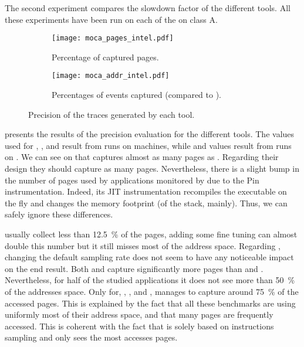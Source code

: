 The second experiment compares the
slowdown factor of the different tools.  All these experiments have been run on each of the \NPB on class A.

\begin{figure}[htb]
    \centering
    \begin{subfigure}{\linewidth}
        \texttt{[image: moca\_pages\_intel.pdf]}
        \caption{Percentage of captured pages.}
        \label{fig:pages}
    \end{subfigure}
    \begin{subfigure}{\linewidth}
        \texttt{[image: moca\_addr\_intel.pdf]}
        \caption{Percentages of events captured (compared to \Moca).}
        \label{fig:addr}
    \end{subfigure}
    \caption{Precision of the traces generated by each tool.}
    \label{fig:pages-addr}
\end{figure}

 presents the results of the precision evaluation for the
different tools. The values used for \Mitos, \MitosTun, \Moca and
\TABARNAC result from runs on \Edel machines, while \MemProf and \MemProfTun values result from runs on
\Stremi.
We can see on  that \Moca captures almost as many pages as \TABARNAC.
Regarding their design they should capture as many pages. Nevertheless, there is a slight
bump in the number of pages used by applications monitored by \TABARNAC due to the Pin instrumentation.
Indeed, its JIT instrumentation recompiles the executable on the fly and changes the memory footprint
(of the stack, mainly). Thus, we can safely ignore these differences.

\Mitos usually collect less than \SI{12.5}{\%} of the pages, adding some fine tuning
can almost double this number but it still misses most of the address space.
Regarding \MemProf, changing the default sampling rate does not seem to
have any noticeable impact on the end result. Both \MemProf and \MemProfTun capture significantly more pages than
\Mitos and \MitosTun. Nevertheless, for half of the studied applications it does
not see more than \SI{50}{\%} of the addresses space. Only for, \BT, \LU, \SP and \UA,
\MemProf manages to capture around \SI{75}{\%} of the accessed pages. This is explained by the fact that all these
benchmarks are using uniformly most of their address space, and that many pages are frequently accessed.
This is coherent with the fact that \MemProf is solely based on instructions sampling and only sees the most accesses pages.

